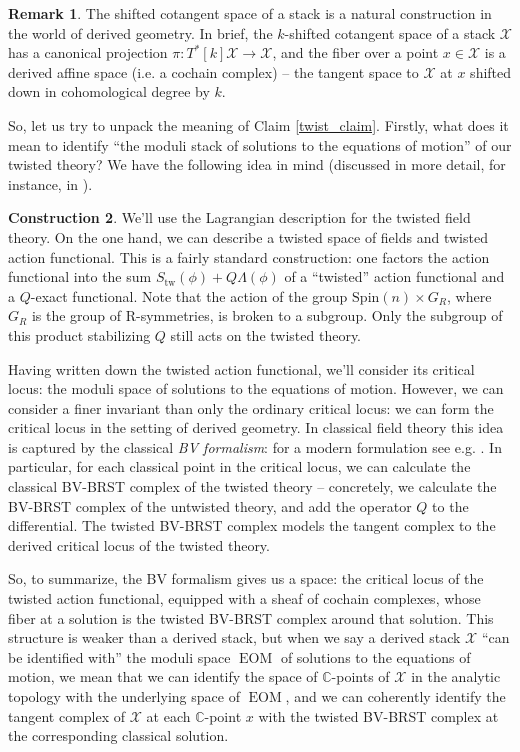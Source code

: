 \documentclass[11pt, oneside, reqno]{amsart}
\theoremstyle{definition} \newtheorem{definition}{Definition}[section]
\newtheorem{construction}[definition]{Construction}
\theoremstyle{definition} \newtheorem{remark}[definition]{Remark}
\theoremstyle{definition} \newtheorem{remarks}[definition]{Remarks}
\theoremstyle{definition} \newtheorem{question}[definition]{Question}
\theoremstyle{definition} \newtheorem*{note}{Note}
\theoremstyle{definition} \newtheorem{example}[definition]{Example}
\theoremstyle{definition} \newtheorem{examples}[definition]{Examples}
\newcommand{\mr}[1]{\mathrm{#1}}
\newcommand{\mc}[1]{\mathcal{#1}}
\newcommand{\CC}{\mathbb{C}}
\newcommand{\Spin}{\mathrm{Spin}}
\DeclareMathOperator{\EOM}{EOM}
\begin{document}
\begin{remark}
The shifted cotangent space of a stack is a natural construction in the world of derived geometry.  In brief, the $k$-shifted cotangent space of a stack $\mc X$ has a canonical projection $\pi \colon T^*[k]\mc X \to \mc X$, and the fiber over a point $x \in \mc X$ is a derived affine space (i.e. a cochain complex) -- the tangent space to $\mc X$ at $x$ shifted down in cohomological degree by $k$.
\end{remark}

So, let us try to unpack the meaning of Claim \ref{twist_claim}.  Firstly, what does it mean to identify ``the moduli stack of solutions to the equations of motion'' of our twisted theory?  We have the following idea in mind (discussed in more detail, for instance, in \cite{CostelloSUSY, ElliottYoo1}).

\begin{construction} \label{twist_construction}
We'll use the Lagrangian description for the twisted field theory.  On the one hand, we can describe a twisted space of fields and twisted action functional.  This is a fairly standard construction: one factors the action functional into the sum $S_{\mr{tw}}(\phi) + Q\Lambda(\phi)$ of a ``twisted'' action functional and a $Q$-exact functional.  Note that the action of the group $\Spin(n) \times G_R$, where $G_R$ is the group of R-symmetries, is broken to a subgroup.  Only the subgroup of this product stabilizing $Q$ still acts on the twisted theory. 

Having written down the twisted action functional, we'll consider its critical locus: the moduli space of solutions to the equations of motion.  However, we can consider a finer invariant than only the ordinary critical locus: we can form the critical locus in the setting of derived geometry.  In classical field theory this idea is captured by the classical \emph{BV formalism}: for a modern formulation see e.g. \cite{CostelloBook}.  In particular, for each classical point in the critical locus, we can calculate the classical BV-BRST complex of the twisted theory -- concretely, we calculate the BV-BRST complex of the untwisted theory, and add the operator $Q$ to the differential.  The twisted BV-BRST complex models the tangent complex to the derived critical locus of the twisted theory.

So, to summarize, the BV formalism gives us a space: the critical locus of the twisted action functional, equipped with a sheaf of cochain complexes, whose fiber at a solution is the twisted BV-BRST complex around that solution.  This structure is weaker than a derived stack, but when we say a derived stack $\mc X$ ``can be identified with'' the moduli space $\EOM$ of solutions to the equations of motion, we mean that we can identify the space of $\CC$-points of $\mc X$ in the analytic topology with the underlying space of $\EOM$, and we can coherently identify the tangent complex of $\mc X$ at each $\CC$-point $x$ with the twisted BV-BRST complex at the corresponding classical solution.
\end{construction}
\end{document}
